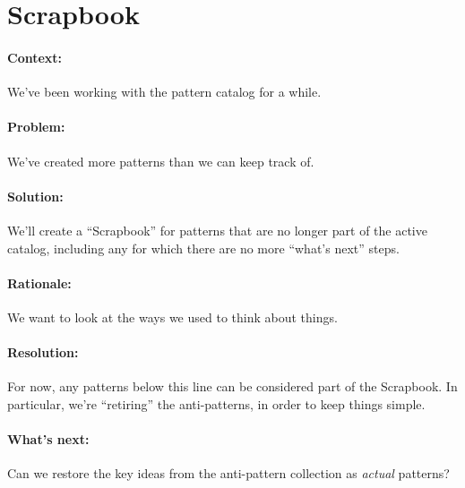 \section{Scrapbook}

\paragraph{Context:} We've been working with the pattern catalog for a while.
\paragraph{Problem:} We've created more patterns than we can keep track of.
\paragraph{Solution:} We'll create a ``Scrapbook'' for patterns that are no longer part of the active catalog, including any for which there are no more ``what's next'' steps.
\paragraph{Rationale:} We want to look at the ways we used to think about things.
\paragraph{Resolution:} For now, any patterns below this line can be considered part of the Scrapbook.  In particular, we're ``retiring'' the anti-patterns, in order to keep things simple.
\paragraph{What's next:} Can we restore the key ideas from the anti-pattern collection as \emph{actual} patterns?
